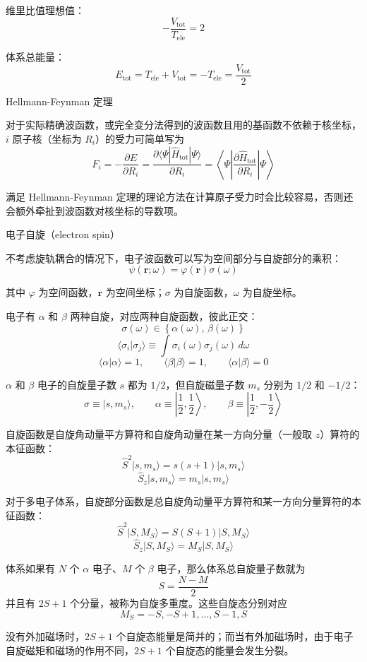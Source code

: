 维里比值理想值：
\[
-\frac{V_{\mathrm{tot}}}{T_{\mathrm{ele}}}=2
\]

体系总能量：
\[
E_{\mathrm{tot}}=T_{\mathrm{ele}}+V_{\mathrm{tot}}=-T_{\mathrm{ele}}=\frac{V_{\mathrm{tot}}}{2}
\]

Hellmann-Feynman 定理

对于实际精确波函数，或完全变分法得到的波函数且用的基函数不依赖于核坐标，$i$ 原子核（坐标为 $R_i$）的受力可简单写为
\[
F_i=-\frac{\partial E}{\partial R_i}
=
\frac{\partial \langle \Psi|\hat H_{\mathrm{tot}}|\Psi\rangle}{\partial R_i}
=
\left\langle \Psi\left|\frac{\partial \hat H_{\mathrm{tot}}}{\partial R_i}\right|\Psi\right\rangle
\]

满足 Hellmann-Feynman 定理的理论方法在计算原子受力时会比较容易，否则还会额外牵扯到波函数对核坐标的导数项。

电子自旋（electron spin）

不考虑旋轨耦合的情况下，电子波函数可以写为空间部分与自旋部分的乘积：
\[
\psi(\mathbf r;\omega)=\varphi(\mathbf r)\sigma(\omega)
\]

其中 $\varphi$ 为空间函数，$\mathbf r$ 为空间坐标；$\sigma$ 为自旋函数，$\omega$ 为自旋坐标。

电子有 $\alpha$ 和 $\beta$ 两种自旋，对应两种自旋函数，彼此正交：
\[
\sigma(\omega)\in
\left\{
\alpha(\omega),\,
\beta(\omega)
\right\}
\]
\[
\langle \sigma_i|\sigma_j\rangle \equiv \int \sigma_i(\omega)\sigma_j(\omega)\,d\omega
\]
\[
\langle \alpha|\alpha\rangle=1,\qquad
\langle \beta|\beta\rangle=1,\qquad
\langle \alpha|\beta\rangle=0
\]

$\alpha$ 和 $\beta$ 电子的自旋量子数 $s$ 都为 $1/2$，但自旋磁量子数 $m_s$ 分别为 $1/2$ 和 $-1/2$：
\[
\sigma\equiv |s,m_s\rangle,\qquad
\alpha\equiv\left|\frac{1}{2},\frac{1}{2}\right\rangle,\qquad
\beta\equiv\left|\frac{1}{2},-\frac{1}{2}\right\rangle
\]

自旋函数是自旋角动量平方算符和自旋角动量在某一方向分量（一般取 $z$）算符的本征函数：
\[
\hat S^2|s,m_s\rangle=s(s+1)|s,m_s\rangle
\]
\[
\hat S_z|s,m_s\rangle=m_s|s,m_s\rangle
\]

对于多电子体系，自旋部分函数是总自旋角动量平方算符和某一方向分量算符的本征函数：
\[
\hat S^2|S,M_S\rangle=S(S+1)|S,M_S\rangle
\]
\[
\hat S_z|S,M_S\rangle=M_S|S,M_S\rangle
\]

体系如果有 $N$ 个 $\alpha$ 电子、$M$ 个 $\beta$ 电子，那么体系总自旋量子数就为
\[
S=\frac{N-M}{2}
\]
并且有 $2S+1$ 个分量，被称为自旋多重度。这些自旋态分别对应
\[
M_S=-S,-S+1,\ldots,S-1,S
\]

没有外加磁场时，$2S+1$ 个自旋态能量是简并的；而当有外加磁场时，由于电子自旋磁矩和磁场的作用不同，$2S+1$ 个自旋态的能量会发生分裂。

